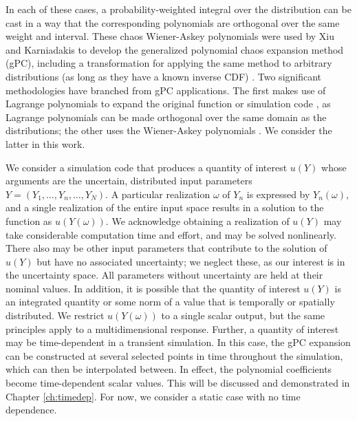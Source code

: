 In each of these cases, a probability-weighted
integral over the distribution can be cast in a way that the corresponding polynomials are orthogonal over the
same weight and interval.  These chaos Wiener-Askey polynomials were used by Xiu and Karniadakis to develop
the generalized polynomial chaos expansion method (gPC), including a transformation for applying the same
method to arbitrary distributions (as long as they have a known inverse CDF) \cite{xiu}.  Two significant
methodologies have branched from gPC applications.  The first makes use of Lagrange polynomials to expand the
original function or simulation code \cite{SCLagrange}, as Lagrange polynomials can be made orthogonal over the same domain as the
distributions; the other uses the Wiener-Askey polynomials \cite{xiu}.  We consider the latter in this work.

We consider a simulation code that produces a quantity of interest $u(Y)$ whose
arguments are the uncertain, distributed input
parameters $Y=(Y_1,\ldots,Y_n,\ldots,Y_N)$.  A particular realization $\omega$ of $Y_n$ is expressed by
$Y_n(\omega)$, and a single realization of the entire input space results in a solution to the function as
$u(Y(\omega))$.  We acknowledge obtaining a realization of $u(Y)$ may take considerable computation time and
effort, and may be solved nonlinearly.  There also may be other input parameters that
contribute to the solution of $u(Y)$ but have no associated uncertainty; we neglect these, as our interest 
is in the uncertainty space.  All parameters without uncertainty are held at their nominal values.
In addition, it is possible that the quantity of interest $u(Y)$ is an integrated quantity or some norm of a
value that is temporally or spatially distributed. We restrict $u(Y(\omega))$ to a single scalar
output, but the same principles apply to a multidimensional response.  Further, a quantity of interest may be
time-dependent in a transient simulation.  In this case, the gPC expansion can be constructed at several selected points
in time throughout the simulation, which can then be interpolated between.  In effect, the polynomial
coefficients become time-dependent scalar values.  This will be discussed and demonstrated in Chapter \ref{ch:timedep}. 
For now, we consider a static case with no time dependence.

